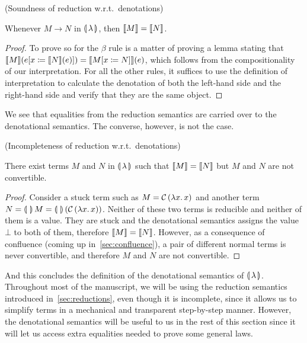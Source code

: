 \begin{observation}\label{obs:denotation-soundness}
  (Soundness of reduction w.r.t.\ denotations)

  Whenever $M \to N$ in $\llparenthesis \, \lambda \, \rrparenthesis$, then $\llbracket M \rrbracket = \llbracket N \rrbracket$.
\end{observation}

\begin{proof}
  To prove so for the $\beta$ rule is a matter of proving a lemma stating
  that $\llbracket M \rrbracket(e[x \coloneqq \llbracket N \rrbracket(e)]) = \llbracket M[x \coloneqq N] \rrbracket(e)$,
  which follows from the compositionality of our interpretation. For all
  the other rules, it suffices to use the definition of interpretation to
  calculate the denotation of both the left-hand side and the right-hand
  side and verify that they are the same object.
\end{proof}

We see that equalities from the reduction semantics are carried over to the
denotational semantics. The converse, however, is not the case.

\begin{observation}
  (Incompleteness of reduction w.r.t.\ denotations)
  
  There exist terms $M$ and $N$ in $\llparenthesis \, \lambda \, \rrparenthesis$ such that
  $\llbracket M \rrbracket = \llbracket N \rrbracket$ but $M$ and $N$ are not convertible.
\end{observation}

\begin{proof}
  Consider a stuck term such as $M = \mathcal{C}\,(\lambda x.\, x)$ and another
  term $N = \llparenthesis \,  \, \rrparenthesis\,M =
  \llparenthesis \,  \, \rrparenthesis\,(\mathcal{C}\,(\lambda x.\, x))$. Neither of these two terms is
  reducible and neither of them is a value. They are stuck and the
  denotational semantics assigns the value $\bot$ to both of them,
  therefore $\llbracket M \rrbracket = \llbracket N \rrbracket$. However, as a consequence of confluence
  (coming up in~\ref{sec:confluence}), a pair of different normal terms is
  never convertible, and therefore $M$ and $N$ are not convertible.
\end{proof}

And this concludes the definition of the denotational semantics of
$\llparenthesis \, \lambda \, \rrparenthesis$. Throughout most of the manuscript, we will be using the
reduction semantics introduced in~\ref{sec:reductions}, even though it is
incomplete, since it allows us to simplify terms in a mechanical and
transparent step-by-step manner. However, the denotational semantics will
be useful to us in the rest of this section since it will let us access
extra equalities needed to prove some general laws.


